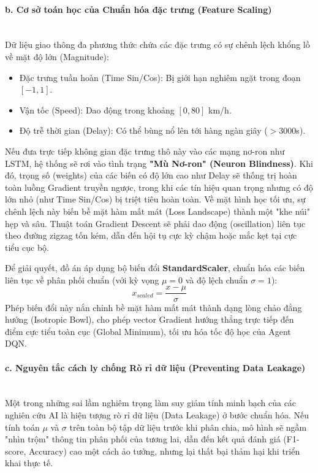 \paragraph{b. Cơ sở toán học của Chuẩn hóa đặc trưng (Feature Scaling)} \mbox{} \\
Dữ liệu giao thông đa phương thức chứa các đặc trưng có sự chênh lệch khổng lồ về mặt độ lớn (Magnitude):
\begin{itemize}
    \item Đặc trưng tuần hoàn (Time Sin/Cos): Bị giới hạn nghiêm ngặt trong đoạn $[-1, 1]$.
    \item Vận tốc (Speed): Dao động trong khoảng $[0, 80]$ km/h.
    \item Độ trễ thời gian (Delay): Có thể bùng nổ lên tới hàng ngàn giây ($> 3000$s).
\end{itemize}

Nếu đưa trực tiếp không gian đặc trưng thô này vào các mạng nơ-ron như LSTM, hệ thống sẽ rơi vào tình trạng \textbf{"Mù Nơ-ron" (Neuron Blindness)}. Khi đó, trọng số (weights) của các biến có độ lớn cao như Delay sẽ thống trị hoàn toàn luồng Gradient truyền ngược, trong khi các tín hiệu quan trọng nhưng có độ lớn nhỏ (như Time Sin/Cos) bị triệt tiêu hoàn toàn. Về mặt hình học tối ưu, sự chênh lệch này biến bề mặt hàm mất mát (Loss Landscape) thành một "khe núi" hẹp và sâu. Thuật toán Gradient Descent sẽ phải dao động (oscillation) liên tục theo đường zigzag tốn kém, dẫn đến hội tụ cực kỳ chậm hoặc mắc kẹt tại cực tiểu cục bộ.

Để giải quyết, đồ án áp dụng bộ biến đổi \textbf{StandardScaler}, chuẩn hóa các biến liên tục về phân phối chuẩn (với kỳ vọng $\mu = 0$ và độ lệch chuẩn $\sigma = 1$):
\begin{equation}
    x_{scaled} = \frac{x - \mu}{\sigma}
\end{equation}
Phép biến đổi này nắn chỉnh bề mặt hàm mất mát thành dạng lòng chảo đẳng hướng (Isotropic Bowl), cho phép vector Gradient hướng thẳng trực tiếp đến điểm cực tiểu toàn cục (Global Minimum), tối ưu hóa tốc độ học của Agent DQN.

\paragraph{c. Nguyên tắc cách ly chống Rò rỉ dữ liệu (Preventing Data Leakage)} \mbox{} \\
Một trong những sai lầm nghiêm trọng làm suy giảm tính minh bạch của các nghiên cứu AI là hiện tượng rò rỉ dữ liệu (Data Leakage) ở bước chuẩn hóa. Nếu tính toán $\mu$ và $\sigma$ trên toàn bộ tập dữ liệu trước khi phân chia, mô hình sẽ ngầm "nhìn trộm" thông tin phân phối của tương lai, dẫn đến kết quả đánh giá (F1-score, Accuracy) cao một cách ảo tưởng, nhưng lại thất bại thảm hại khi triển khai thực tế.

